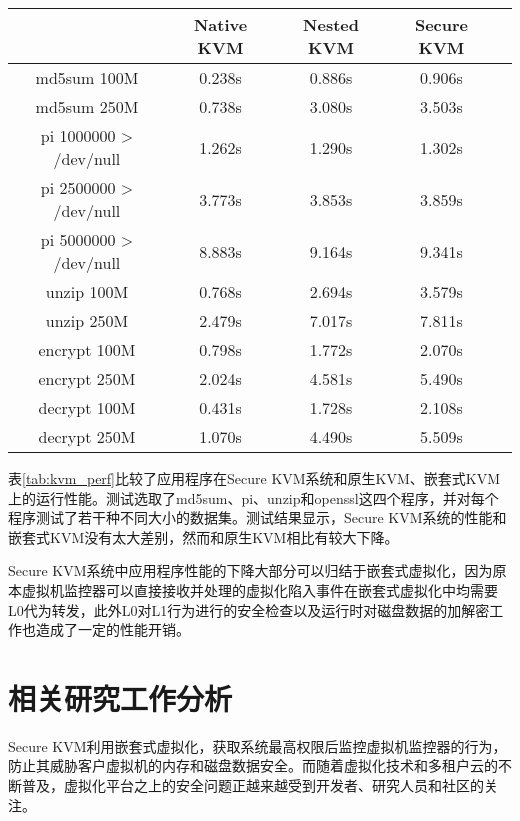 \begin{table}[htbp]
  \centering
    \begin{tabular}{ccccc}
    \toprule
          & Native KVM & Nested KVM & Secure KVM \\
    \midrule
    md5sum 100M & 0.238s & 0.886s & 0.906s \\
    md5sum 250M & 0.738s & 3.080s & 3.503s \\
    pi 1000000 > /dev/null & 1.262s & 1.290s & 1.302s \\
    pi 2500000 > /dev/null & 3.773s & 3.853s & 3.859s \\
    pi 5000000 > /dev/null & 8.883s & 9.164s & 9.341s \\
    unzip 100M & 0.768s & 2.694s & 3.579s \\
    unzip 250M & 2.479s & 7.017s & 7.811s \\
    encrypt 100M & 0.798s & 1.772s & 2.070s \\
    encrypt 250M & 2.024s & 4.581s & 5.490s \\
    decrypt 100M & 0.431s & 1.728s & 2.108s \\
    decrypt 250M & 1.070s & 4.490s & 5.509s \\
    \bottomrule
    \end{tabular}%
\end{table}%

表\ref{tab:kvm_perf}比较了应用程序在Secure KVM系统和原生KVM、嵌套式KVM上的运行性能。测试选取了md5sum、pi、unzip和openssl这四个程序，并对每个程序测试了若干种不同大小的数据集。测试结果显示，Secure KVM系统的性能和嵌套式KVM没有太大差别，然而和原生KVM相比有较大下降。

Secure KVM系统中应用程序性能的下降大部分可以归结于嵌套式虚拟化，因为原本虚拟机监控器可以直接接收并处理的虚拟化陷入事件在嵌套式虚拟化中均需要L0代为转发，此外L0对L1行为进行的安全检查以及运行时对磁盘数据的加解密工作也造成了一定的性能开销。


\section{相关研究工作分析}

Secure KVM利用嵌套式虚拟化，获取系统最高权限后监控虚拟机监控器的行为，防止其威胁客户虚拟机的内存和磁盘数据安全。而随着虚拟化技术和多租户云的不断普及，虚拟化平台之上的安全问题正越来越受到开发者、研究人员和社区的关注。

